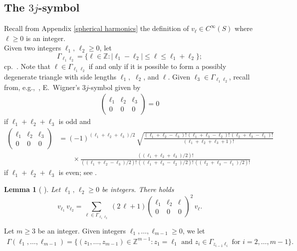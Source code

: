 \documentclass[11pt]{amsart}
\newtheorem{lemma}[theorem]{Lemma}
\theoremstyle {definition}
\begin{document}
\begin{appendices}
\section{The $3j$-symbol} \label{3j appendix}
Recall from Appendix \ref{spherical harmonics} the definition of $v_{\ell}\in C^\infty(S)$ where $\ell\geq0$ is an integer. \\ \indent 
Given two integers $\ell_1,\,\ell_2\geq0$, let 
$$
\Gamma_{\ell_1\ell_2}=\{\ell\in \mathbb{Z}:|\ell_1-\ell_2|\leq  \ell\leq  \ell_1+\ell_2\};
$$
cp.~\cite[\S3.7]{Edmonds2}. Note that $\ell\in \Gamma_{\ell_1\ell_2}$ if and only if it is possible to form a possibly degenerate triangle with side lengths $\ell_1,$ $\ell_2$, and $\ell$. Given $\ell_3\in \Gamma_{\ell_1\ell_2}$, recall from, e.g.,~\cite[\S3.7]{Edmonds2}, E.~Wigner's $3j$-symbol given by
\begin{align*} %
	\begin{pmatrix} \ell_1 & \ell_2 &\ell_3 \\
		0& 0 & 0
	\end{pmatrix}=0
\end{align*}
if  $\ell_1+\ell_2+\ell_3$ is odd and
\begin{equation} \label{wigner even}
	\begin{aligned}  
		\begin{pmatrix} \ell_1 & \ell_2 &\ell_3 \\
			0& 0 & 0
		\end{pmatrix}&=(-1)^{(\ell_1+\ell_2+\ell_3)/2}\,\sqrt{\frac{(\ell_1+\ell_2-\ell_3)!\,(\ell_1+\ell_3-\ell_2)!\,(\ell_2+\ell_3-\ell_1)!}{(\ell_1+\ell_2+\ell_3+1)!}}\, \\
		&\qquad \times  \frac{((\ell_1+\ell_2+\ell_3)/2)!}{((\ell_1+\ell_2-\ell_3)/2)!\,((\ell_1+\ell_3-\ell_2)/2)!\,((\ell_2+\ell_3-\ell_1)/2)!}
	\end{aligned}
\end{equation} 
if  $\ell_1+\ell_2+\ell_3$ is even; see \cite[(3.7.17)]{Edmonds2}.
\begin{lemma}[{\cite[(3.5.7)]{Edmonds2}}%
	] \label{product}
	Let $\ell_1,\,\ell_2\geq 0$ be integers. There holds
	$$
	v_{\ell_1}\,v_{\ell_2}=\sum_{\ell\in \Gamma_{\ell_1\ell_2}}\,(2\,\ell+1)\begin{pmatrix} \ell_1 & \ell_2 &\ell \\
		0& 0 & 0
	\end{pmatrix}^2\,v_\ell.
	$$	
\end{lemma}
Let $m\geq 3$ be an integer. Given integers $\ell_1,\ldots,\ell_{m-1}\geq0$, we let \begin{align} \label{gamma coefficient} \Gamma(\ell_1,\ldots,\ell_{m-1})=\{(z_1,\ldots,z_{m-1})\in \mathbb{Z}^{m-1}:z_1=\ell_1\text{ and }z_i\in \Gamma_{z_{i-1}\ell_{i}} \text{ for } i=2,\ldots,m-1 \}.\end{align} 

\end{appendices}
\end{document}

